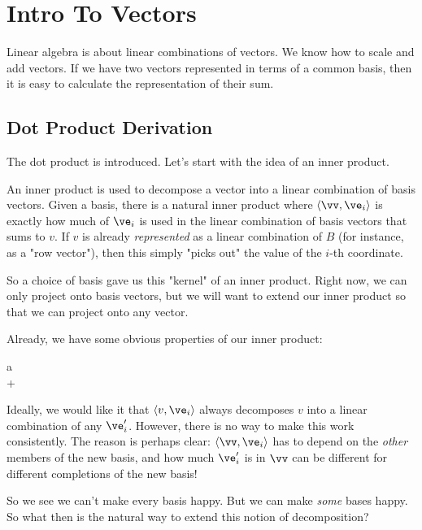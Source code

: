 \section{Intro To Vectors}

Linear algebra is about linear combinations of vectors. We know how to
scale and add vectors. If we have two vectors represented in terms of
a common basis, then it is easy to calculate the representation of
their sum.

\subsection{Dot Product Derivation}

The dot product is introduced. Let's start with the idea of an inner
product.

An inner product is used to decompose a vector into a linear combination
of basis vectors. Given a basis, there is a natural inner product where
$\iprod{\vv}{\ve_i}$ is exactly how much of $\ve_i$ is used in the
linear combination of basis vectors that sums to $v$. If $v$ is already
\emph{represented} as a linear combination of $B$ (for instance, as a
"row vector"), then this simply "picks out" the value of the $i$-th
coordinate.

So a choice of basis gave us this "kernel" of an inner product. Right
now, we can only project onto basis vectors, but we will want to
extend our inner product so that we can project onto any vector.

Already, we have some obvious properties of our inner product:

\begin{nedqn}
\eqcol
  a
\\
\eqcol
   + 
\end{nedqn}

Ideally, we would like it that $\iprod{v}{\ve_i}$ always decomposes $v$
into a linear combination of any $\ve_i'$. However, there is no way to
make this work consistently. The reason is perhaps clear:
$\iprod{\vv}{\ve_i}$ has to depend on the \emph{other} members of the
new basis, and how much $\ve_i'$ is in $\vv$ can be different for
different completions of the new basis!

So we see we can't make every basis happy. But we can make \emph{some}
bases happy. So what then is the natural way to extend this notion of
decomposition?


